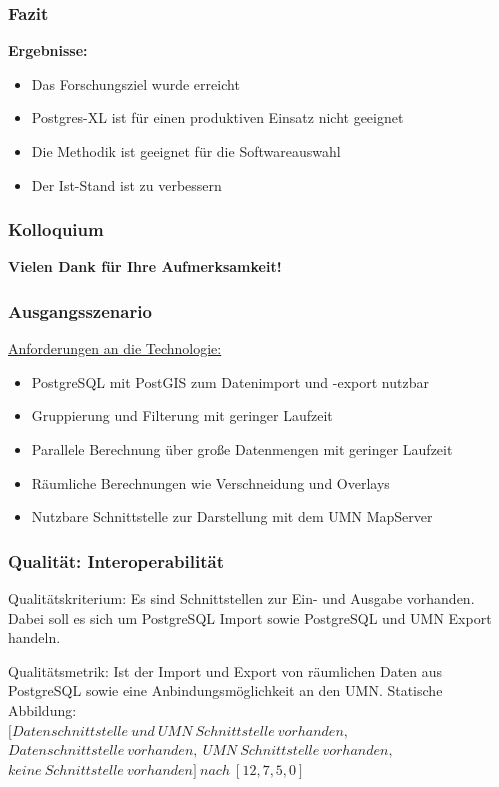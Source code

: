 \documentclass{beamer}
\begin{document}
\begin{frame}\frametitle{Fazit}
\textbf{Ergebnisse:}\\
\begin{itemize}
\item Das Forschungsziel wurde erreicht
\item Postgres-XL ist für einen produktiven Einsatz nicht geeignet
\item Die Methodik ist geeignet für die Softwareauswahl%
\item Der Ist-Stand ist zu verbessern
\end{itemize}
\end{frame}
 
\begin{frame}\frametitle{Kolloquium}
\begin{center}
\textbf{Vielen Dank für Ihre Aufmerksamkeit!}
\end{center}
\end{frame} 
 
\begin{frame}\frametitle{}

\end{frame} 

\begin{frame}\frametitle{Ausgangsszenario}
\underline{Anforderungen an die Technologie:}
\begin{itemize}
\item PostgreSQL mit PostGIS zum Datenimport und -export nutzbar
\item Gruppierung und Filterung mit geringer Laufzeit
\item Parallele Berechnung über große Datenmengen mit geringer Laufzeit
\item Räumliche Berechnungen wie Verschneidung und Overlays
\item Nutzbare Schnittstelle zur Darstellung mit dem UMN MapServer
\end{itemize}
\end{frame}
 
\begin{frame}\frametitle{Qualität: Interoperabilität}
\begin{block}{Qualitätskriterium:}
Es sind Schnittstellen zur Ein- und Ausgabe vorhanden. Dabei soll es sich um PostgreSQL Import sowie PostgreSQL und UMN Export handeln.
\end{block}

\begin{block}{Qualitätsmetrik:}
Ist der Import und Export von räumlichen Daten aus PostgreSQL sowie eine Anbindungsmöglichkeit an den UMN.
Statische Abbildung:\\
$[Datenschnittstelle\ und\ UMN\ Schnittstelle\ vorhanden,$\\$Datenschnittstelle\ vorhanden,\ UMN\ Schnittstelle\ vorhanden,$\\$keine\ Schnittstelle\ vorhanden]\ nach\ [12,7,5,0]$
\end{block}
\end{frame} 
\end{document}
